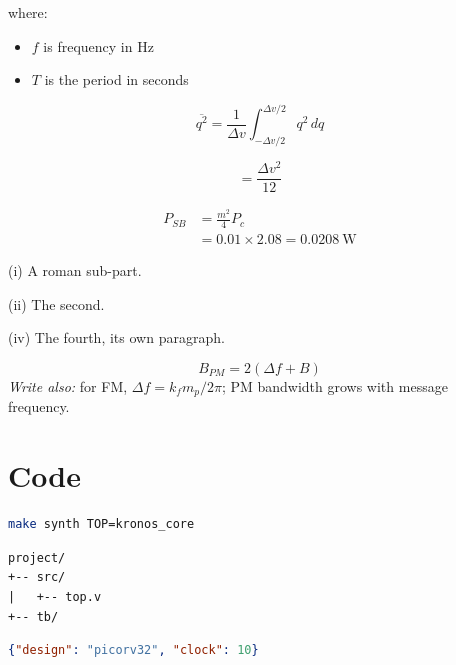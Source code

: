 where:

\begin{itemize}
    \item $f$ is frequency in Hz
    \item $T$ is the period in seconds
\end{itemize}

\begin{equation}
    \overline{q^2} = \frac{1}{\Delta v}\int_{-\Delta v/2}^{\Delta v/2} q^2\,dq
    \label{eq:equations_2}
\end{equation}

\begin{equation}
    = \frac{\Delta v^2}{12}
    \label{eq:equations_3}
\end{equation}

\begin{equation}
    \begin{aligned}
    P_{SB} &= \frac{m^2}{4} P_c \\
    &= 0.01 \times 2.08 = 0.0208~\text{W}
    \end{aligned}
    \label{eq:equations_4}
\end{equation}

(i) A roman sub-part.

(ii) The second.

(iv) The fourth, its own paragraph.

\begin{eqnote}{
\begin{equation}
    \boxed{B_{PM} = 2(\Delta f + B)}
    \label{eq:equations_5}
\end{equation}
}{\emph{Write also:} for FM, $\Delta f = k_f m_p/2\pi$; PM bandwidth grows with message frequency.}
\end{eqnote}


\section{Code}
\label{sec:code}

\begin{lstlisting}[language=bash, caption={Listing}]
make synth TOP=kronos_core
\end{lstlisting}

\begin{lstlisting}[caption={Listing}]
project/
+-- src/
|   +-- top.v
+-- tb/
\end{lstlisting}

\begin{lstlisting}[language=json, caption={Listing}]
{"design": "picorv32", "clock": 10}
\end{lstlisting}

